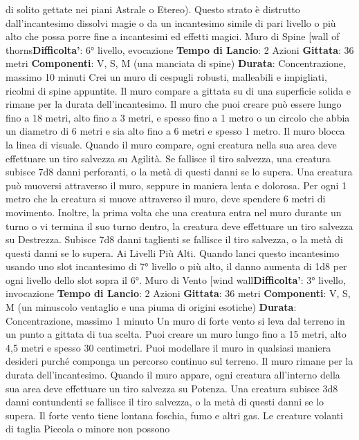 \begin{multicols}{2}
di solito gettate nei piani Astrale o Etereo). Questo
strato è distrutto dall’incantesimo dissolvi magie o da un
incantesimo simile di pari livello o più alto che possa
porre fine a incantesimi ed effetti magici.
Muro di Spine
[wall of thorns\textbf{Difficolta'}:
6° livello, evocazione
\textbf{Tempo di Lancio}: 2 Azioni
\textbf{Gittata}: 36 metri
\textbf{Componenti}: V, S, M (una manciata di spine)
\textbf{Durata}: Concentrazione, massimo 10 minuti
Crei un muro di cespugli robusti, malleabili e impigliati,
ricolmi di spine appuntite. Il muro compare a gittata su
di una superficie solida e rimane per la durata
dell’incantesimo. Il muro che puoi creare può essere
lungo fino a 18 metri, alto fino a 3 metri, e spesso fino a
1 metro o un circolo che abbia un diametro di 6 metri e
sia alto fino a 6 metri e spesso 1 metro. Il muro blocca
la linea di visuale.
Quando il muro compare, ogni creatura nella sua area
deve effettuare un tiro salvezza su Agilità. Se
fallisce il tiro salvezza, una creatura subisce 7d8 danni
perforanti, o la metà di questi danni se lo supera.
Una creatura può muoversi attraverso il muro, seppure
in maniera lenta e dolorosa. Per ogni 1 metro che la
creatura si muove attraverso il muro, deve spendere 6
metri di movimento. Inoltre, la prima volta che una
creatura entra nel muro durante un turno o vi termina il
suo turno dentro, la creatura deve effettuare un tiro
salvezza su Destrezza. Subisce 7d8 danni taglienti se
fallisce il tiro salvezza, o la metà di questi danni se lo
supera.
Ai Livelli Più Alti. Quando lanci questo incantesimo
usando uno slot incantesimo di 7° livello o più alto, il
danno aumenta di 1d8 per ogni livello dello slot sopra il
6°.
Muro di Vento
[wind wall\textbf{Difficolta'}:
3° livello, invocazione
\textbf{Tempo di Lancio}: 2 Azioni
\textbf{Gittata}: 36 metri
\textbf{Componenti}: V, S, M (un minuscolo ventaglio e una
piuma di origini esotiche)
\textbf{Durata}: Concentrazione, massimo 1 minuto
Un muro di forte vento si leva dal terreno in un punto a
gittata di tua scelta. Puoi creare un muro lungo fino a 15
metri, alto 4,5 metri e spesso 30 centimetri. Puoi
modellare il muro in qualsiasi maniera desideri purché
componga un percorso continuo sul terreno. Il muro
rimane per la durata dell’incantesimo.
Quando il muro appare, ogni creatura all’interno della
sua area deve effettuare un tiro salvezza su Potenza. Una
creatura subisce 3d8 danni contundenti se fallisce il tiro
salvezza, o la metà di questi danni se lo supera.
Il forte vento tiene lontana foschia, fumo e altri gas. Le
creature volanti di taglia Piccola o minore non possono

\end{multicols}
